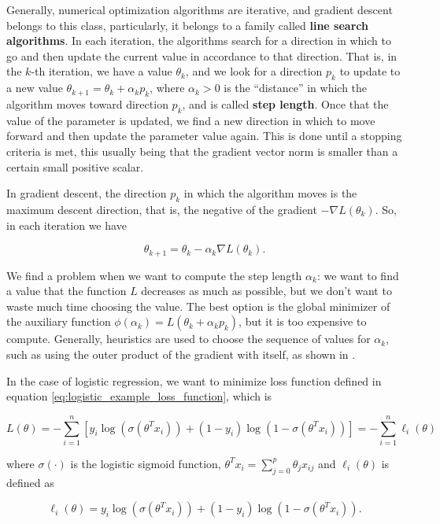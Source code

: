 Generally, numerical optimization algorithms are iterative, and gradient descent belongs to this class, particularly, it belongs to a family called \textbf{line search algorithms}. In each iteration, the algorithms search for a direction in which to go and then update the current value in accordance to that direction. That is, in the $k$-th iteration, we have a value $\theta_k$, and we look for a direction $p_k$ to update to a new value $\theta_{k+1} = \theta_k + \alpha_k p_k$, where $\alpha_k > 0$ is the ``distance'' in which the algorithm moves toward direction $p_k$, and is called \textbf{step length}. Once that the value of the parameter is updated, we find a new direction in which to move forward and then update the parameter value again. This is done until a stopping criteria is met, this usually being that the gradient vector norm is smaller than a certain small positive scalar.

In gradient descent, the direction $p_k$ in which the algorithm moves is the maximum descent direction, that is, the negative of the gradient $-\nabla L(\theta_k)$. So, in each iteration we have

\begin{equation}
  \theta_{k+1} = \theta_k - \alpha_k \nabla L(\theta_k).
\end{equation}

We find a problem when we want to compute the step length $\alpha_k$: we want to find a value that the function $L$ decreases as much as possible, but we don't want to waste much time choosing the value. The best option is the global minimizer of the auxiliary function $\phi(\alpha_k) = L(\theta_k + \alpha_k p_k)$, but it is too expensive to compute. Generally, heuristics are used to choose the sequence of values for $\alpha_k$, such as using the outer product of the gradient with itself, as shown in \cite{duchi2011adaptive}.

In the case of logistic regression, we want to minimize loss function defined in equation \ref{eq:logistic_example_loss_function}, which is

$$
  L(\theta) = - \sum_{i=1}^{n} \left[ y_i \log(\sigma(\theta^T x_i)) + (1-y_i) \log(1-\sigma(\theta^T x_i)) \right] =
  - \sum_{i=1}^{n}{\ell_i(\theta)}
$$

where $\sigma(\cdot)$ is the logistic sigmoid function, $\theta^T x_i = \sum_{j=0}^{p}{\theta_j x_{ij}}$ and $\ell_i(\theta)$ is defined as

$$
  \ell_i(\theta) = y_i \log(\sigma(\theta^T x_i)) + (1-y_i) \log(1-\sigma(\theta^T x_i)).
$$

